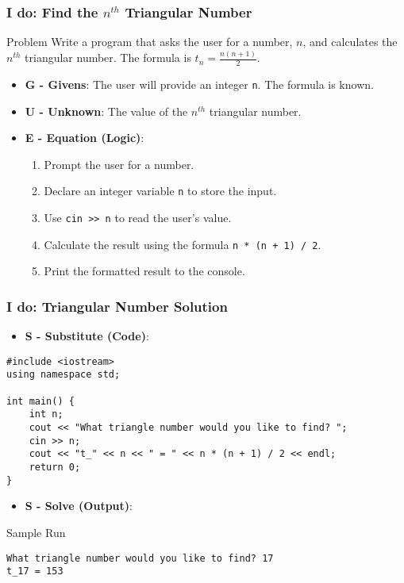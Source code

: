 \documentclass{beamer}
\begin{document}
\begin{frame}
\frametitle{I do: Find the $n^{th}$ Triangular Number}
\begin{block}{Problem}
Write a program that asks the user for a number, $n$, and calculates the $n^{th}$ triangular number. The formula is $t_n = \frac{n(n+1)}{2}$.
\end{block}

\begin{itemize}
    \item \textbf{G - Givens}: The user will provide an integer \texttt{n}. The formula is known.
    \item \textbf{U - Unknown}: The value of the $n^{th}$ triangular number.
    \item \textbf{E - Equation (Logic)}:
    \begin{enumerate}
        \item Prompt the user for a number.
        \item Declare an integer variable \texttt{n} to store the input.
        \item Use \texttt{cin >> n} to read the user's value.
        \item Calculate the result using the formula \texttt{n * (n + 1) / 2}.
        \item Print the formatted result to the console.
    \end{enumerate}
\end{itemize}
\end{frame}

\begin{frame}[fragile]
\frametitle{I do: Triangular Number Solution}
\begin{itemize}
    \item \textbf{S - Substitute (Code)}:
\end{itemize}
\begin{verbatim}
#include <iostream>
using namespace std;

int main() {
    int n;
    cout << "What triangle number would you like to find? ";
    cin >> n;
    cout << "t_" << n << " = " << n * (n + 1) / 2 << endl;
    return 0;
}
\end{verbatim}
\begin{itemize}
    \item \textbf{S - Solve (Output)}:
\end{itemize}
\begin{block}{Sample Run}
\begin{verbatim}
What triangle number would you like to find? 17
t_17 = 153
\end{verbatim}
\end{block}
\end{frame}
\end{document}
